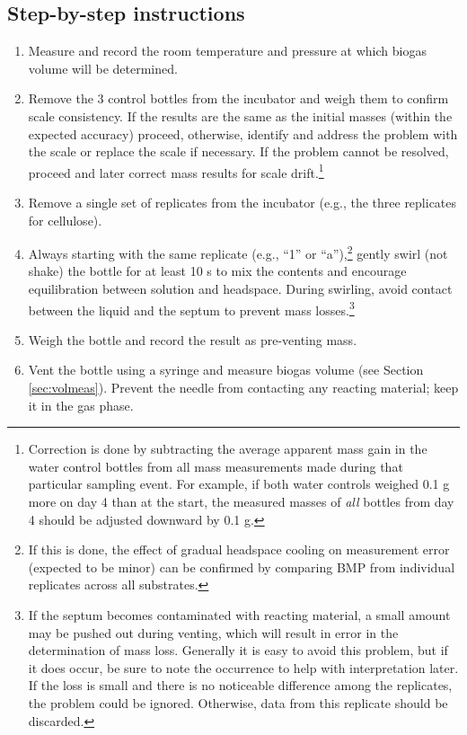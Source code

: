 \documentclass[]{article}
\begin{document}
\subsection{Step-by-step instructions} 
\label{sec:steps}
\begin{enumerate}
    \item Measure and record the room temperature and pressure at which biogas volume will be determined.
    \item Remove the 3 control bottles from the incubator and weigh them to confirm scale consistency. 
      If the results are the same as the initial masses (within the expected accuracy) proceed, otherwise, identify and address the problem with the scale or replace the scale if necessary.
      If the problem cannot be resolved, proceed and later correct mass results for scale drift.\footnote{
        Correction is done by subtracting the average apparent mass gain in the water control bottles from all mass measurements made during that particular sampling event. 
        For example, if both water controls weighed 0.1 g more on day 4 than at the start, the measured masses of \textit{all} bottles from day 4 should be adjusted downward by 0.1 g.
      }
    \item Remove a single set of replicates from the incubator (e.g., the three replicates for cellulose).
    \item Always starting with the same replicate (e.g., ``1'' or ``a''),\footnote{
        If this is done, the effect of gradual headspace cooling on measurement error (expected to be minor) can be confirmed by comparing BMP from individual replicates across all substrates.
      } gently swirl (not shake) the bottle for at least 10 s to mix the contents and encourage  equilibration between solution and headspace. 
      During swirling, avoid contact between the liquid and the septum to prevent mass losses.\footnote{
        If the septum becomes contaminated with reacting material, a small amount may be pushed out during venting, which will result in error in the determination of mass loss.
        Generally it is easy to avoid this problem, but if it does occur, be sure to note the occurrence to help with interpretation later.
        If the loss is small and there is no noticeable difference among the replicates, the problem could be ignored. 
        Otherwise, data from this replicate should be discarded.
      }
    \item Weigh the bottle and record the result as pre-venting mass.
    \item Vent the bottle using a syringe and measure biogas volume (see Section \ref{sec:volmeas}). Prevent the needle from contacting any reacting material; keep it in the gas phase. 

\end{enumerate}
\end{document}
